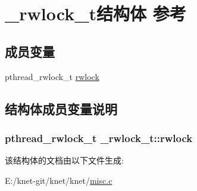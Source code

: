 \hypertarget{a00044}{}\section{\+\_\+rwlock\+\_\+t结构体 参考}
\label{a00044}
\subsection*{成员变量}
\begin{DoxyCompactItemize}
\item 
pthread\+\_\+rwlock\+\_\+t \hyperlink{a00044_a6b2f734403f5fc751ca46ddb98476a92_a6b2f734403f5fc751ca46ddb98476a92}{rwlock}
\end{DoxyCompactItemize}


\subsection{结构体成员变量说明}
\hypertarget{a00044_a6b2f734403f5fc751ca46ddb98476a92_a6b2f734403f5fc751ca46ddb98476a92}{}
\subsubsection[{rwlock}]{\setlength{\rightskip}{0pt plus 5cm}pthread\+\_\+rwlock\+\_\+t \+\_\+rwlock\+\_\+t\+::rwlock}\label{a00044_a6b2f734403f5fc751ca46ddb98476a92_a6b2f734403f5fc751ca46ddb98476a92}


该结构体的文档由以下文件生成\+:\begin{DoxyCompactItemize}
\item 
E\+:/knet-\/git/knet/knet/\hyperlink{a00099}{misc.\+c}\end{DoxyCompactItemize}
